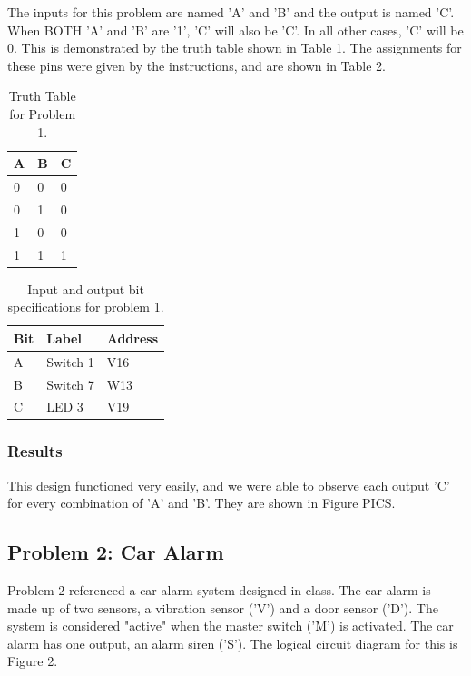 \documentclass[11pt]{article}
\begin{document}
The inputs for this problem are named 'A' and 'B' and the output is named 'C'. When BOTH 'A' and 'B' are '1', 'C' will also be 'C'. In all other cases, 'C' will be 0. This is demonstrated by the truth table shown in Table 1. The assignments for these pins were given by the instructions, and are shown in Table 2.

\begin{table}[h]
\begin{center}
	\begin{tabular}{| l | l | l |}
		\hline
		A & B & C \\ \hline
		0 & 0 & 0 \\ \hline
		0 & 1 & 0 \\ \hline
		1 & 0 & 0 \\ \hline
		1 & 1 & 1 \\ \hline
	\end{tabular}
	\caption{\label{tab:table-name}Truth Table for Problem 1.}
\end{center}	
\end{table}

\begin{table}[h]
\begin{center}
	\begin{tabular}{| l | l | l |}
		\hline
		Bit & Label & Address\\ \hline
		A & Switch 1 & V16\\ \hline
		B & Switch 7 & W13\\ \hline
		C & LED 3 & V19\\ \hline
	\end{tabular}
	\caption{\label{tab:table-name}Input and output bit specifications for problem 1.}
\end{center}
\end{table}

\subsubsection{Results}

This design functioned very easily, and we were able to observe each output 'C' for every combination of 'A' and 'B'. They are shown in Figure PICS. 

\subsection{Problem 2: Car Alarm}

Problem 2 referenced a car alarm system designed in class. The car alarm is made up of two sensors, a vibration sensor ('V') and a door sensor ('D'). The system is considered "active" when the master switch ('M') is activated. The car alarm has one output, an alarm siren ('S'). The logical circuit diagram for this is Figure 2.
\end{document}
